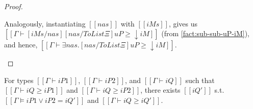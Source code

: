 \begin{proof}
\begin{caseof}
    Analogously, instantiating $[[nas]]$ with $[[iMs]]$,
    gives us $[[Γ ⊢ [iMs / nas][nas / ToList Ξ]uP ≥ ↓iM ]]$
    (from \ref{fact:sub-sub-uP-iM}), and hence,
    $[[Γ ⊢ ∃nas.[nas / ToList Ξ]uP ≥ ↓iM]]$.

  \end{caseof}

\end{proof}


\begin{lemma}
  \label{lemma:lub-completeness}
  For types $[[Γ ⊢ iP1]]$, $[[Γ ⊢ iP2]]$, and $[[Γ ⊢ iQ]]$
  such that $[[Γ ⊢ iQ ≥ iP1]]$ and $[[Γ ⊢ iQ ≥ iP2]]$,
  there exists $[[iQ']]$ s.t. $[[Γ ⊨ iP1 ∨ iP2 = iQ']]$ 
  and $[[Γ ⊢ iQ ≥ iQ']]$.
\end{lemma}

